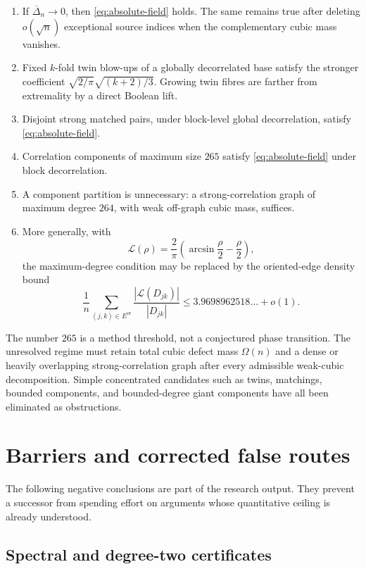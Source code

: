 \documentclass[11pt]{article}
\theoremstyle{definition}
\theoremstyle{remark}
\begin{document}
\begin{enumerate}[label=(\roman*)]
\item If $\overline\Delta_n\to0$, then
      \eqref{eq:absolute-field} holds.  The same remains true after deleting
      $o(\sqrt n)$ exceptional source indices when the complementary cubic
      mass vanishes.
\item Fixed $k$-fold twin blow-ups of a globally decorrelated base satisfy
      the stronger coefficient
      $\sqrt{2/\pi}\sqrt{(k+2)/3}$.  Growing twin fibres are farther from
      extremality by a direct Boolean lift.
\item Disjoint strong matched pairs, under block-level global decorrelation,
      satisfy \eqref{eq:absolute-field}.
\item Correlation components of maximum size $265$ satisfy
      \eqref{eq:absolute-field} under block decorrelation.
\item A component partition is unnecessary: a strong-correlation graph of
      maximum degree $264$, with weak off-graph cubic mass, suffices.
\item More generally, with
      \[
      \mathcal L(\rho)=\frac2\pi
      \left(\arcsin\frac\rho2-\frac\rho2\right),
      \]
      the maximum-degree condition may be replaced by the oriented-edge
      density bound
      \[
      \frac1n\sum_{(j,k)\in E^{\mathrm{or}}}
      \frac{|\mathcal L(D_{jk})|}{|D_{jk}|}
      \le3.9698962518\ldots+o(1).
      \]
\end{enumerate}

The number $265$ is a method threshold, not a conjectured phase transition.
The unresolved regime must retain total cubic defect mass $\Omega(n)$ and a
dense or heavily overlapping strong-correlation graph after every admissible
weak-cubic decomposition.  Simple concentrated candidates such as twins,
matchings, bounded components, and bounded-degree giant components have all
been eliminated as obstructions.

\section{Barriers and corrected false routes}

The following negative conclusions are part of the research output.  They
prevent a successor from spending effort on arguments whose quantitative
ceiling is already understood.

\subsection{Spectral and degree-two certificates}
\end{document}

